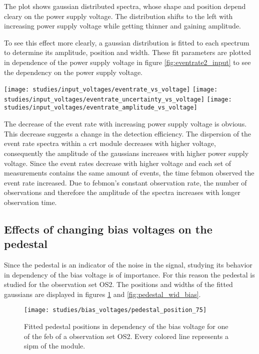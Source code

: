 \pagebreak
The plot shows gaussian distributed spectra, whose shape and position depend cleary on the power supply voltage.
The distribution shifts to the left with increasing power supply voltage while getting thinner and gaining amplitude.

To see this effect more clearly, a gaussian distribution is fitted to each spectrum to determine its amplitude, position and width.
These fit parameters are plotted in dependence of the power supply voltage in figure \ref{fig:eventrate2_input} to see the dependency on the power supply voltage.

\begin{figure*}
  \centering
  \texttt{[image: studies/input\_voltages/eventrate\_vs\_voltage]}
  \texttt{[image: studies/input\_voltages/eventrate\_uncertainty\_vs\_voltage]}
  \texttt{[image: studies/input\_voltages/eventrate\_amplitude\_vs\_voltage]}
  \caption{Fit parameters (fltr: position, width and amplitude) of the event rate distributions in dependency of the power supply voltages.}
  \label{fig:eventrate2_input}
\end{figure*}

The decrease of the event rate with increasing power supply voltage is obvious.
This decrease suggests a change in the detection efficiency.
The dispersion of the event rate spectra within a \gls{crt} module decreases with higher voltage, consequently the amplitude of the gaussians increases with higher power supply voltage.
Since the event rates decrease with higher voltage and each set of measurements contains the same amount of events, the time febmon observed the event rate increased.
Due to febmon's constant observation rate, the number of observations and therefore the amplitude of the spectra increases with longer observation time.

\subsection{Effects of changing bias voltages on the pedestal}

Since the pedestal is an indicator of the noise in the signal, studying its behavior in dependency of the bias voltage is of importance.
For this reason the pedestal is studied for the observation set OS2.
The positions and widths of the fitted gaussians are displayed in figures \ref{fig:pedestal_pos_bias} and \ref{fig:pedestal_wid_bias}.

\begin{figure}
  \centering
  \texttt{[image: studies/bias\_voltages/pedestal\_position\_75]}
  \caption{%
    Fitted pedestal positions in dependency of the bias voltage for one of the \gls{feb} of a observation set OS2.
    Every colored line represents a \gls{sipm} of the module.
  }
  \label{fig:pedestal_pos_bias}
\end{figure}

